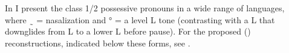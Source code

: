 \documentclass[output=paper]{langsci/langscibook}
\begin{document}

In  I present the class 1/2 possessive pronouns in a wide range of  languages, where~ { ̰  } 
= nasalization and ° = a level L tone (contrasting with a L that downglides from L to a lower L before pause). For the proposed  () reconstructions, indicated below these forms, see    \citet[85]{HymanTadadjeu1976}.
\end{document}
